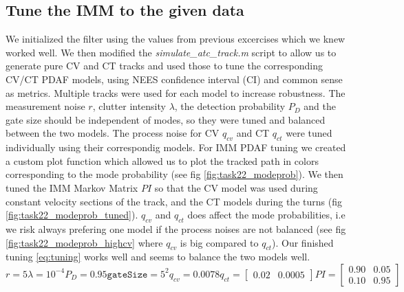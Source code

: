 \subsection{Tune the IMM to the given data}

We initialized the filter using the values from previous excercises which we knew worked well. We then modified the \textit{simulate\_atc\_track.m} script to allow us to generate pure CV and CT tracks and used those to tune the corresponding CV/CT PDAF models, using NEES confidence interval (CI) and common sense as metrics. Multiple tracks were used for each model to increase robustness. The measurement noise $r$, clutter intensity $\lambda$, the detection probability $P_D$ and the gate size should be independent of modes, so they were tuned and balanced between the two models. The process noise for CV $q_{cv}$ and CT $q_{ct}$ were tuned individually using their correspondig models. For IMM PDAF tuning we created a custom plot function which allowed us to plot the tracked path in colors corresponding to the mode probability (see fig \ref{fig:task22_modeprob}). We then tuned the IMM Markov Matrix $PI$ so that the CV model was used during constant velocity sections of the track, and the CT models during the turns (fig \ref{fig:task22_modeprob_tuned}). $q_{cv}$ and $q_{ct}$ does affect the mode probabilities, i.e we risk always prefering one model if the process noises are not balanced (see fig \ref{fig:task22_modeprob_highcv} where $q_{cv}$ is big compared to $q_{ct}$). Our finished tuning \ref{eq:tuning} works well and seems to balance the two models well.
\begin{subequations} \label{eq:tuning}
    \begin{equation}
        r = 5
    \end{equation}
    \begin{equation}
        \lambda = 10^{-4} 
    \end{equation}
    \begin{equation}
        P_D = 0.95
    \end{equation}
    \begin{equation}
        \texttt{gateSize} = 5^2 
    \end{equation}
    \begin{equation}
        q_{cv} = 0.0078 
    \end{equation}
    \begin{equation}
        q_{ct} = \begin{bmatrix}0.02 & 0.0005\end{bmatrix}
    \end{equation}
    \begin{equation}
        PI = \begin{bmatrix}0.90 & 0.05 \\ 0.10 & 0.95\end{bmatrix}
    \end{equation}
\end{subequations}

